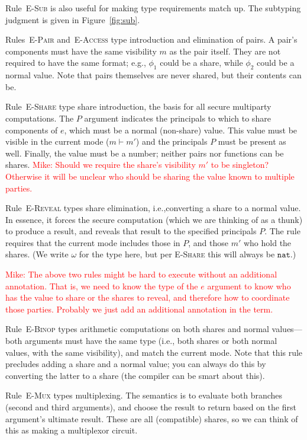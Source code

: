 \documentclass[10pt]{article}
\newcommand{\rulelab}[1]{{\small \textsc{#1}}}
\newcommand{\tnat}{\ensuremath{\mathtt{nat}}}
\newcommand{\mwh}[1]{\textcolor{red}{Mike: #1}}
\begin{document}
Rule~\rulelab{E-Sub} is also useful for making type requirements match
up. The subtyping judgment is given in Figure~\ref{fig:sub}.

Rules~\rulelab{E-Pair} and~\rulelab{E-Access} type introduction and
elimination of pairs. A pair's components must have the same
visibility $m$ as the pair itself. They are not required to have the
same format; e.g., $\phi_1$ could be a share, while $\phi_2$ could be
a normal value. Note that pairs themselves are never shared, but their
contents can be.

Rule~\rulelab{E-Share} type share introduction, the basis for all secure
multiparty computations. The $P$ argument indicates the principals to
which to share components of $e$, which must be a normal (non-share)
value. This value must be visible in the current mode ($m \vdash m'$)
and the principals $P$ must be present as well. Finally, the value
must be a number; neither pairs nor functions can be shares.
\mwh{Should we require the share's visibility $m'$ to be singleton?
  Otherwise it will be unclear who should be sharing the value known
  to multiple parties.}

Rule~\rulelab{E-Reveal} types share elimination, i.e.,converting a
share to a normal value. In essence, it forces the secure computation
(which we are thinking of as a thunk) to produce a result, and reveals
that result to the specified principals $P$. The rule requires that
the current mode includes those in $P$, and those $m'$ who hold the
shares. (We write $\omega$ for the type here, but per
\rulelab{E-Share} this will always be $\tnat$.)

\mwh{The above two rules might be hard to execute without an
  additional annotation. That is, we need to know the type of the $e$
  argument to know who has the value to share or the shares to reveal,
  and therefore how to coordinate those parties. Probably we just add
  an additional annotation in the term.}

Rule~\rulelab{E-Binop} types arithmetic computations on both shares
and normal values---both arguments must have the same type (i.e., both
shares or both normal values, with the same visibility), and match the
current mode. Note that this rule precludes adding a 
share and a normal value; you can always do this by converting the
latter to a share (the compiler can be smart about this).

Rule~\rulelab{E-Mux} types multiplexing. The semantics is to evaluate
both branches (second and third arguments), and choose the result to
return based on the first argument's ultimate result. These are all
(compatible) shares, so we can think of this as making a multiplexor
circuit. 
\end{document}
